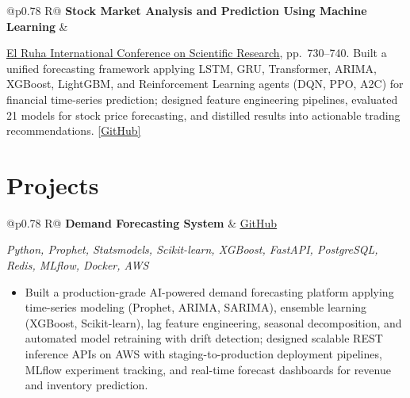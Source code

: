 \documentclass[a4paper,10pt]{article}
\newcommand{\ulink}[2]{\href{#1}{\uline{#2}}}
\newcommand{\subheading}[1]{{\color[HTML]{0A0A0A}\fontsize{12}{14}\selectfont\bfseries #1}}
\newcommand{\techstack}[1]{{\color[HTML]{5C5C5C}\fontsize{10.5}{12.5}\selectfont\itshape #1}}
\newcommand{\meta}[1]{{\color[HTML]{5C5C5C}\fontsize{10.5}{12.5}\selectfont #1}}
\begin{document}
\begin{tabularx}{\linewidth}{@{}p{0.78\linewidth} R@{}}
\subheading{Stock Market Analysis and Prediction Using Machine Learning} & \meta{2025}
\end{tabularx}
\vspace{1pt}
{\color[HTML]{0A0A0A}\fontsize{11}{14}\selectfont
\ulink{https://www.elruha.org/_files/ugd/614b1f_6b95e1b697bf452b9907ba46e0151c05.pdf\#page=774}{El Ruha International Conference on Scientific Research}, pp.\ 730--740. Built a unified forecasting framework applying LSTM, GRU, Transformer, ARIMA, XGBoost, LightGBM, and Reinforcement Learning agents (DQN, PPO, A2C) for financial time-series prediction; designed feature engineering pipelines, evaluated 21 models for stock price forecasting, and distilled results into actionable trading recommendations. \ulink{https://github.com/su-jin1425/Set-Project}{[GitHub]}}

\vspace{2pt}

\section{Projects}
\vspace{2pt}

\begin{tabularx}{\linewidth}{@{}p{0.78\linewidth} R@{}}
\subheading{Demand Forecasting System} & \meta{\ulink{https://github.com/su-jin1425/Demand-Forecasting-System}{GitHub}}
\end{tabularx}
\vspace{1pt}
\techstack{Python, Prophet, Statsmodels, Scikit-learn, XGBoost, FastAPI, PostgreSQL, Redis, MLflow, Docker, AWS}
\begin{itemize}[nosep, leftmargin=1.5em, itemsep=1pt, topsep=2pt]
\item {\color[HTML]{0A0A0A}\fontsize{11}{14}\selectfont
Built a production-grade AI-powered demand forecasting platform applying time-series modeling (Prophet, ARIMA, SARIMA), ensemble learning (XGBoost, Scikit-learn), lag feature engineering, seasonal decomposition, and automated model retraining with drift detection; designed scalable REST inference APIs on AWS with staging-to-production deployment pipelines, MLflow experiment tracking, and real-time forecast dashboards for revenue and inventory prediction.}
\end{itemize}

\vspace{2pt}
\end{document}
